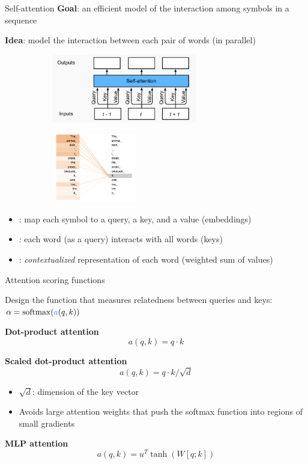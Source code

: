 \documentclass[usenames,dvipsnames,notes,11pt,aspectratio=169,hyperref={colorlinks=true, linkcolor=blue}]{beamer}
\begin{document}
\begin{frame}
    {Self-attention}
    \textbf{Goal}: an efficient model of the interaction among symbols in a sequence %

    \textbf{Idea}: model the interaction between each pair of words (in parallel)
    \pause

    \begin{figure}
        \begin{subfigure}{.5\textwidth}
        \includegraphics[height=3cm]{figures/self-attn}
        \end{subfigure}
        \begin{subfigure}{.4\textwidth}
        \includegraphics[height=3cm]{figures/self-attn-ex}
        \end{subfigure}
    \end{figure}
    \begin{itemize}[<+->]
        \item {}: map each symbol to a query, a key, and a value (embeddings)
        \item {}: each word (as a query) interacts with all words (keys)
        \item {}: \emph{contextualized} representation of each word (weighted sum of values)
    \end{itemize}
\end{frame}

\begin{frame}
    {Attention scoring functions}

    Design the function that measures relatedness between queries and keys:
    ${\alpha}= \mathrm{softmax}({\color{blue}{a}}({q}, k))$
    \pause

    \textbf{Dot-product attention}
    $$
    a(q, k) = q\cdot k
    $$
    \pause

    \textbf{Scaled dot-product attention}
    $$
    a(q, k) = q \cdot k / \sqrt{d} 
    $$
    \vspace{-3em}
    \begin{itemize}
        \item $\sqrt{d}$: dimension of the key vector
        \item Avoids large attention weights that push the softmax function into regions of small gradients
    \end{itemize}
    \pause

    \textbf{MLP attention}
    $$
    a(q, k) = u^T \tanh(W[q;k]) 
    $$
\end{frame}
\end{document}
